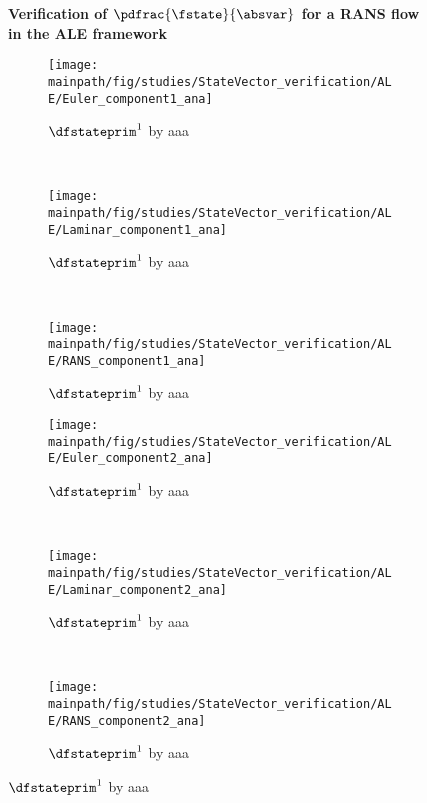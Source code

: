 \documentclass[../main.tex]{subfiles}
\begin{document}
\begin{figure}[t!]
    \centering

    \textbf{Verification of $\pdfrac{\fstate}{\absvar}$ for a RANS flow in the ALE framework}\par\medskip    
    
    \begin{subfigure}[t]{0.33\textwidth}
        \centering
        \texttt{[image: \\mainpath/fig/studies/StateVector\_verification/ALE/Euler\_component1\_ana]}
        \caption{$\dfstateprim^1$ by aaa}
    \end{subfigure}%
    ~ 
    \begin{subfigure}[t]{0.33\textwidth}
        \centering
        \texttt{[image: \\mainpath/fig/studies/StateVector\_verification/ALE/Laminar\_component1\_ana]}
        \caption{$\dfstateprim^1$ by aaa}
    \end{subfigure}%
    ~ 
    \begin{subfigure}[t]{0.33\textwidth}
        \centering
        \texttt{[image: \\mainpath/fig/studies/StateVector\_verification/ALE/RANS\_component1\_ana]}
        \caption{$\dfstateprim^1$ by aaa}
    \end{subfigure}
    
    \begin{subfigure}[t]{0.33\textwidth}
        \centering
        \texttt{[image: \\mainpath/fig/studies/StateVector\_verification/ALE/Euler\_component2\_ana]}
        \caption{$\dfstateprim^1$ by aaa}
    \end{subfigure}%
    ~ 
    \begin{subfigure}[t]{0.33\textwidth}
        \centering
        \texttt{[image: \\mainpath/fig/studies/StateVector\_verification/ALE/Laminar\_component2\_ana]}
        \caption{$\dfstateprim^1$ by aaa}
    \end{subfigure}%
    ~ 
    \begin{subfigure}[t]{0.33\textwidth}
        \centering
        \texttt{[image: \\mainpath/fig/studies/StateVector\_verification/ALE/RANS\_component2\_ana]}
        \caption{$\dfstateprim^1$ by aaa}
    \end{subfigure}
    

\end{figure}
\end{document}
